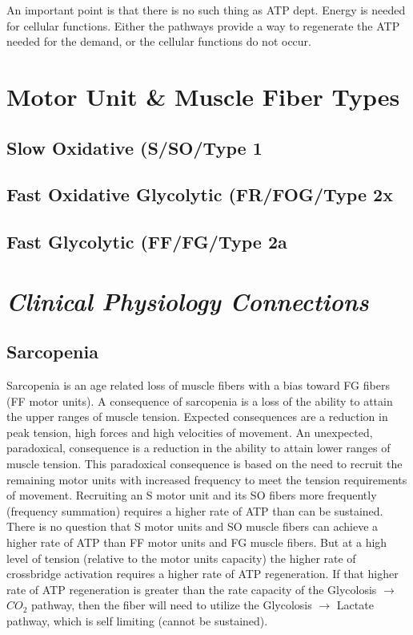 An important point is that there is no such thing as ATP dept. Energy is needed for cellular functions. Either the pathways provide a way to regenerate the ATP needed for the demand, or the cellular functions do not occur.


\section{Motor Unit \& Muscle Fiber Types}

\subsection{Slow Oxidative (S/SO/Type 1}

\subsection{Fast Oxidative Glycolytic (FR/FOG/Type 2x}

\subsection{Fast Glycolytic (FF/FG/Type 2a}




\section{\textit{Clinical Physiology Connections}}

\subsection{Sarcopenia}

Sarcopenia is an age related loss of muscle fibers with a bias toward FG fibers (FF motor units). A consequence of sarcopenia is a loss of the ability to attain the upper ranges of muscle tension. Expected consequences are a reduction in peak tension, high forces and high velocities of movement. An unexpected, paradoxical, consequence is a reduction in the ability to attain lower ranges of muscle tension. This paradoxical consequence is based on the need to recruit the remaining motor units with increased frequency to meet the tension requirements of movement. Recruiting an S motor unit and its SO fibers more frequently (frequency summation) requires a higher rate of ATP than can be sustained. There is no question that S motor units and SO muscle fibers can achieve a higher rate of ATP than FF motor units and FG muscle fibers. But at a high level of tension (relative to the motor units capacity) the higher rate of crossbridge activation requires a higher rate of ATP regeneration. If that higher rate of ATP regeneration is greater than the rate capacity of the Glycolosis $\rightarrow$ $CO_2$ pathway, then the fiber will need to utilize the Glycolosis $\rightarrow$ Lactate pathway, which is self limiting (cannot be sustained). 

